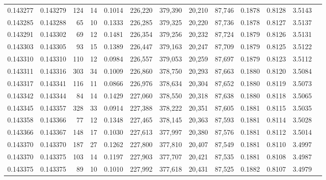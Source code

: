\begin{tabular}{rrrrrrrrrrrrr}
0.143277 & 0.143279 &   124 &  14 &                                     0.1014 & 226,220 & 379,390 &  20,210 &  87,746 & 0.1878 & 0.8128 & 3.5143 \\
0.143285 & 0.143288 &    65 &  10 &                                     0.1333 & 226,285 & 379,325 &  20,220 &  87,736 & 0.1878 & 0.8127 & 3.5137 \\
0.143291 & 0.143302 &    69 &  12 &                                     0.1481 & 226,354 & 379,256 &  20,232 &  87,724 & 0.1879 & 0.8126 & 3.5131 \\
0.143303 & 0.143305 &    93 &  15 &                                     0.1389 & 226,447 & 379,163 &  20,247 &  87,709 & 0.1879 & 0.8125 & 3.5122 \\
0.143310 & 0.143310 &   110 &  12 &                                     0.0984 & 226,557 & 379,053 &  20,259 &  87,697 & 0.1879 & 0.8123 & 3.5112 \\
0.143311 & 0.143316 &   303 &  34 &                                     0.1009 & 226,860 & 378,750 &  20,293 &  87,663 & 0.1880 & 0.8120 & 3.5084 \\
0.143317 & 0.143341 &   116 &  11 &                                     0.0866 & 226,976 & 378,634 &  20,304 &  87,652 & 0.1880 & 0.8119 & 3.5073 \\
0.143342 & 0.143344 &    84 &  14 &                                     0.1429 & 227,060 & 378,550 &  20,318 &  87,638 & 0.1880 & 0.8118 & 3.5065 \\
0.143345 & 0.143357 &   328 &  33 &                                     0.0914 & 227,388 & 378,222 &  20,351 &  87,605 & 0.1881 & 0.8115 & 3.5035 \\
0.143358 & 0.143366 &    77 &  12 &                                     0.1348 & 227,465 & 378,145 &  20,363 &  87,593 & 0.1881 & 0.8114 & 3.5028 \\
0.143366 & 0.143367 &   148 &  17 &                                     0.1030 & 227,613 & 377,997 &  20,380 &  87,576 & 0.1881 & 0.8112 & 3.5014 \\
0.143370 & 0.143370 &   187 &  27 &                                     0.1262 & 227,800 & 377,810 &  20,407 &  87,549 & 0.1881 & 0.8110 & 3.4997 \\
0.143370 & 0.143375 &   103 &  14 &                                     0.1197 & 227,903 & 377,707 &  20,421 &  87,535 & 0.1881 & 0.8108 & 3.4987 \\
0.143375 & 0.143375 &    89 &  10 &                                     0.1010 & 227,992 & 377,618 &  20,431 &  87,525 & 0.1882 & 0.8107 & 3.4979 \\

\end{tabular}
